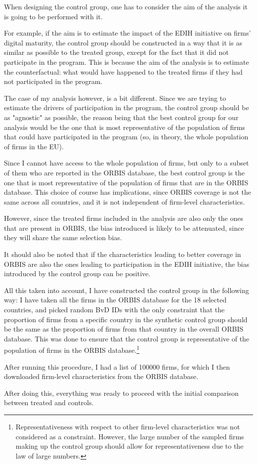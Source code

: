\documentclass[12pt]{report}
\begin{document}
\par When designing the control group, one has to consider the aim of the analysis it is going to be performed with it. 
\par For example, if the aim is to estimate the impact of the EDIH initiative on firms' digital maturity, the control group should be constructed in a way that it is as similar as possible to the treated group, except for the fact that it did not participate in the program. This is because the aim of the analysis is to estimate the counterfactual: what would have happened to the treated firms if they had not participated in the program. 
\par The case of my analysis however, is a bit different. Since we are trying to estimate the drivers of participation in the program, the control group should be as "agnostic" as possible, the reason being that the best control group for our analysis would be the one that is most representative of the population of firms that could have participated in the program (so, in theory, the whole population of firms in the EU). 
\par Since I cannot have access to the whole population of firms, but only to a subset of them who are reported in the ORBIS database, the best control group is the one that is most representative of the population of firms that are in the ORBIS database. This choice of course has implications, since ORBIS coverage is not the same across all countries, and it is not independent of firm-level characteristics.
\par However, since the treated firms included in the analysis are also only the ones that are present in ORBIS, the bias introduced is likely to be attenuated, since they will share the same selection bias.
\par It should also be noted that if the characteristics leading to better coverage in ORBIS are also the ones leading to participation in the EDIH initiative, the bias introduced by the control group can be positive. 

\par All this taken into account, I have constructed the control group in the following way: I have taken all the firms in the ORBIS database for the 18 selected countries, and picked random BvD IDs with the only constraint that the proportion of firms from a specific country in the synthetic control group should be the same as the proportion of firms from that country in the overall ORBIS database. This was done to ensure that the control group is representative of the population of firms in the ORBIS database.\footnote{Representativeness with respect to other firm-level characteristics was not considered as a constraint. However, the large number of the sampled firms making up the control group should allow for representativeness due to the law of large numbers.}
\par After running this procedure, I had a list of 100000 firms, for which I then downloaded firm-level characteristics from the ORBIS database.
\par After doing this, everything was ready to proceed with the initial comparison between treated and controls.
\end{document}
